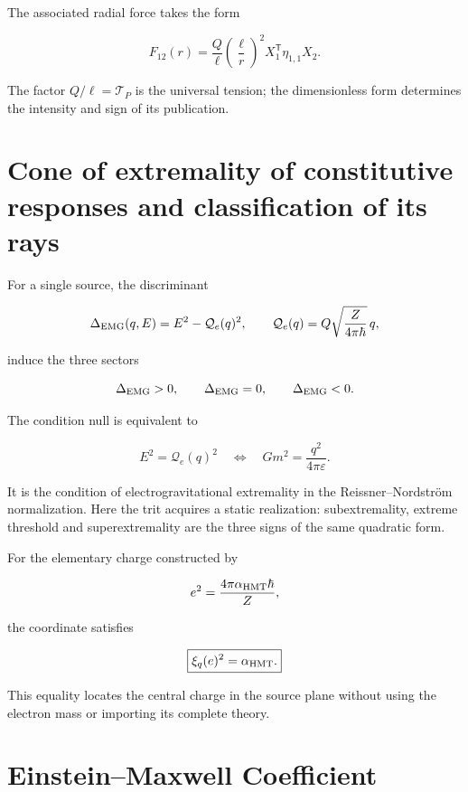 The associated radial force takes the form

\begin{equation}
F_{12}(r)=\frac{Q}{\ell}
\left(\frac{\ell}{r}\right)^2
X_1^{\mathsf T}\eta_{1,1}X_2.
\label{eq:rm-emg-force}
\end{equation}

The factor \(Q/\ell=\mathscr T_P\) is the universal tension; the
dimensionless form determines the intensity and sign of its publication.

\section{Cone of extremality of constitutive responses and classification of its rays}

For a single source, the discriminant

\[
\Delta_{\rm EMG}(q,E)=E^2-\mathcal Q_e(q)^2,
\qquad
\mathcal Q_e(q)=Q\sqrt{\frac{Z}{4\pi\hbar}}\,q,
\]

induce the three sectors

\[
\Delta_{\rm EMG}>0,
\qquad
\Delta_{\rm EMG}=0,
\qquad
\Delta_{\rm EMG}<0.
\]

The condition null is equivalent to

\begin{equation}
E^2=\mathcal Q_e(q)^2
\quad\Longleftrightarrow\quad
Gm^2=\frac{q^2}{4\pi\varepsilon}.
\label{eq:rm-rn-extremality}
\end{equation}

It is the condition of electrogravitational extremality in the Reissner--Nordström
normalization. Here the trit acquires a static realization:
subextremality, extreme threshold and superextremality are the three signs of the
same quadratic form.

For the elementary charge constructed by

\[
e^2=\frac{4\pi\alpha_{\rm HMT}\hbar}{Z},
\]

the coordinate satisfies

\begin{equation}
\boxed{\xi_q(e)^2=\alpha_{\rm HMT}.}
\label{eq:rm-electron-electric-coordinate}
\end{equation}

This equality locates the central charge in the source plane without using the
electron mass or importing its complete theory.

\section{Einstein--Maxwell Coefficient}

